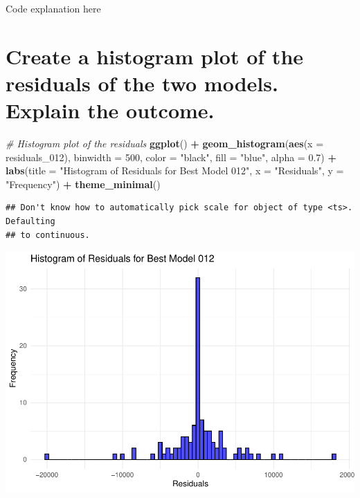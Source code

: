 \documentclass[
]{book}
\newenvironment{Shaded}{\begin{snugshade}}{\end{snugshade}}
\newcommand{\AttributeTok}[1]{\textcolor[rgb]{0.13,0.29,0.53}{#1}}
\newcommand{\CommentTok}[1]{\textcolor[rgb]{0.56,0.35,0.01}{\textit{#1}}}
\newcommand{\DecValTok}[1]{\textcolor[rgb]{0.00,0.00,0.81}{#1}}
\newcommand{\FloatTok}[1]{\textcolor[rgb]{0.00,0.00,0.81}{#1}}
\newcommand{\FunctionTok}[1]{\textcolor[rgb]{0.13,0.29,0.53}{\textbf{#1}}}
\newcommand{\NormalTok}[1]{#1}
\newcommand{\SpecialCharTok}[1]{\textcolor[rgb]{0.81,0.36,0.00}{\textbf{#1}}}
\newcommand{\StringTok}[1]{\textcolor[rgb]{0.31,0.60,0.02}{#1}}
\begin{document}
Code explanation here

\section{Create a histogram plot of the residuals of the two models. Explain the outcome.}\label{create-a-histogram-plot-of-the-residuals-of-the-two-models.-explain-the-outcome.}

\begin{Shaded}
\begin{Highlighting}[]
\CommentTok{\# Histogram plot of the residuals}
\FunctionTok{ggplot}\NormalTok{() }\SpecialCharTok{+}
  \FunctionTok{geom\_histogram}\NormalTok{(}\FunctionTok{aes}\NormalTok{(}\AttributeTok{x =}\NormalTok{ residuals\_012), }\AttributeTok{binwidth =} \DecValTok{500}\NormalTok{, }\AttributeTok{color =} \StringTok{"black"}\NormalTok{, }\AttributeTok{fill =} \StringTok{"blue"}\NormalTok{, }\AttributeTok{alpha =} \FloatTok{0.7}\NormalTok{) }\SpecialCharTok{+}
  \FunctionTok{labs}\NormalTok{(}\AttributeTok{title =} \StringTok{"Histogram of Residuals for Best Model 012"}\NormalTok{, }\AttributeTok{x =} \StringTok{"Residuals"}\NormalTok{, }\AttributeTok{y =} \StringTok{"Frequency"}\NormalTok{) }\SpecialCharTok{+}
  \FunctionTok{theme\_minimal}\NormalTok{()}
\end{Highlighting}
\end{Shaded}

\begin{verbatim}
## Don't know how to automatically pick scale for object of type <ts>. Defaulting
## to continuous.
\end{verbatim}

\includegraphics{bookdown-demo_files/figure-latex/unnamed-chunk-49-1.pdf}
\end{document}
